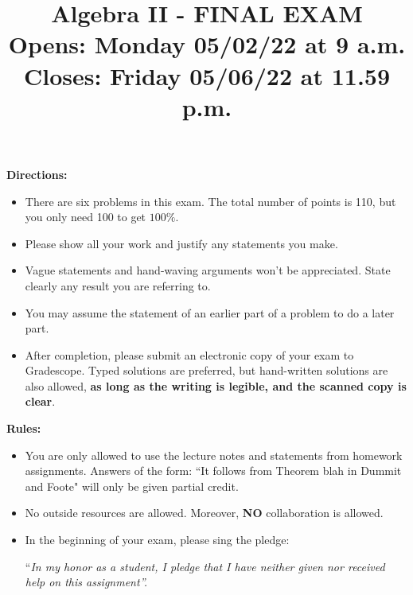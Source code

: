 \documentclass[12pt,
psamsfonts]{amsart}
\title{Algebra II - FINAL EXAM\\
Opens: Monday 05/02/22 at 9 a.m. \\
Closes: Friday 05/06/22 at 11.59 p.m.}
\theoremstyle{remark}
\theoremstyle{definition}
\numberwithin{equation}{section}
\begin{document}
\maketitle

\textbf{Directions:} 
\begin{itemize}
\item There are six problems in this exam. The total number of points is 110, but you only need 100 to get $100\%$.\\
\item Please show all your work and justify any statements you make. \\
\item Vague statements and hand-waving arguments won't be appreciated. State clearly any result you are referring to. \\ 
\item You may assume the statement of an earlier part of a problem to do a later part. \\
\item After completion, please submit an electronic copy of your exam to Gradescope. Typed solutions are preferred, but hand-written solutions are also allowed, \textbf{as long as the writing is legible, and the scanned copy is clear}. 
\end{itemize}

\vspace{100pt}
\textbf{Rules:} \begin{itemize}
\item You are only allowed to use the lecture notes and statements from homework assignments. Answers of the form: ``It follows from Theorem blah in Dummit and Foote" will only be given partial credit. \\ 
\item No outside resources are allowed. Moreover, \textbf{NO} collaboration is allowed. \\

\item In the beginning of your exam, please sing the pledge:

``\textit{In my honor as a student, I pledge that I have neither given nor received help on this assignment''.}
\end{itemize}

\newpage
\end{document}
